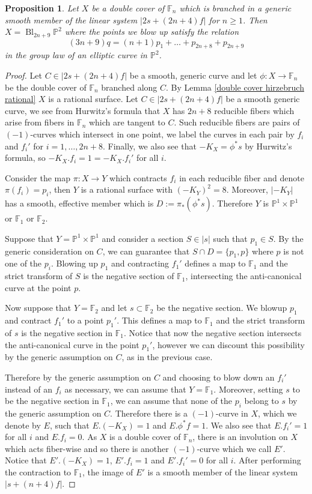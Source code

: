 \documentclass[a4paper]{amsart}
\theoremstyle{definition}
\theoremstyle{plain}
\newtheorem{prop}[defn]{Proposition}
\theoremstyle{remark}
\newcommand{\PS}{\mathbb{P}}
\newcommand{\F}{\mathbb{F}}
\begin{document}
\begin{prop}\label{double cover Hirzeburch is blowup of P2}
Let $X$ be a double cover of $\mathbb{F}_n$ which is branched in a generic smooth member of the linear system $|2s+(2n+4)f|$ for $n \geq 1$. Then $X = \operatorname{Bl}_{2n+9}\mathbb{P}^2$ where the points we blow up satisfy the relation 
$$(3n+9)q=(n+1)p_1+\dots +p_{2n+8}+p_{2n+9}$$
in the group law of an elliptic curve in $\PS^2$.
\end{prop}
\begin{proof}
Let $C\in|2s+(2n+4)f|$ be a smooth, generic curve and let $\phi:X\rightarrow \F_n$ be the double cover of $\F_n$ branched along $C$. By Lemma \ref{double cover hirzebruch rational} $X$ is a rational surface. Let $C \in |2s+(2n+4)f|$ be a smooth generic curve, we see from Hurwitz's formula that $X$ has $2n+8$ reducible fibers which arise from fibers in $\F_n$ which are tangent to $C$. Such reducible fibers are pairs of $(-1)$-curves which intersect in one point, we label the curves in each pair by $f_i$ and $f_i'$ for $i=1,\dots,2n+8$. Finally, we also see that $-K_X=\phi^*s$ by Hurwitz's formula, so $-K_X.f_i=1=-K_X.f_i'$ for all $i$.

Consider the map $\pi:X\rightarrow Y$ which contracts $f_i$ in each reducible fiber and denote $\pi(f_i)=p_i$, then $Y$ is a rational surface with $(-K_Y)^2=8$. Moreover, $|-K_Y|$ has a smooth, effective member which is $D:=\pi_*(\phi^*s)$. Therefore $Y$ is $\PS^1\times\PS^1$ or $\F_1$ or $\F_2$.

Suppose that $Y=\PS^1\times\PS^1$ and consider a section $S\in|s|$ such that $p_1\in S$. By the generic consideration on $C$, we can guarantee that $S\cap D=\{p_1,p\}$ where $p$ is not one of the $p_i$. Blowing up $p_1$ and contracting $f_1'$ defines a map to $\F_1$ and the strict transform of $S$ is the negative section of $\F_1$, intersecting the anti-canonical curve at the point $p$.

Now suppose that $Y=\F_2$ and let $s\subset\F_2$ be the negative section. We blowup $p_1$ and contract $f_1'$ to a point $p_1'$. This defines a map to $\F_1$ and the strict transform of $s$ is the negative section in $\F_1$. Notice that now the negative section intersects the anti-canonical curve in the point $p_1'$, however we can discount this possibility by the generic assumption on $C$, as in the previous case.

Therefore by the generic assumption on $C$ and choosing to blow down an $f_i'$ instead of an $f_i$ as necessary, we can assume that $Y=\F_1$. Moreover, setting $s$ to be the negative section in $\F_1$, we can assume that none of the $p_i$ belong to $s$ by the generic assumption on $C$. Therefore there is a $(-1)$-curve in $X$, which we denote by $E$, such that $E.(-K_X)=1$ and $E.\phi^*f=1$. We also see that $E.f_i'=1$ for all $i$ and $E.f_i=0$. As $X$ is a double cover of $\F_n$, there is an involution on $X$ which acts fiber-wise and so there is another $(-1)$-curve which we call $E'$. Notice that $E'.(-K_X)=1$, $E'.f_i=1$ and $E'.f_i'=0$ for all $i$. After performing the contraction to $\F_1$, the image of $E'$ is a smooth member of the linear system $|s+(n+4)f|$.


\end{proof}
\end{document}
